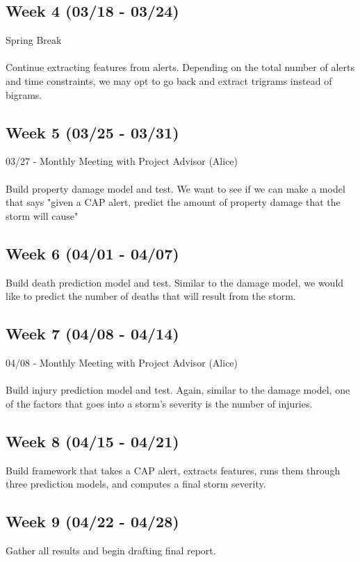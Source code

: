 \documentclass{article}
\begin{document}
\subsection*{Week 4 (03/18 - 03/24)}
Spring Break\\
\\
Continue extracting features from alerts. Depending on the total number of alerts and time constraints, we may opt to go back and extract trigrams instead of bigrams.

\subsection*{Week 5 (03/25 - 03/31)}
03/27 - Monthly Meeting with Project Advisor (Alice)\\
\\
Build property damage model and test. We want to see if we can make a model that says "given a CAP alert, predict the amount of property damage that the storm will cause"

\subsection*{Week 6 (04/01 - 04/07)}
Build death prediction model and test. Similar to the damage model, we would like to predict the number of deaths that will result from the storm.

\subsection*{Week 7 (04/08 - 04/14)}
04/08 - Monthly Meeting with Project Advisor (Alice)\\
\\
Build injury prediction model and test. Again, similar to the damage model, one of the factors that goes into a storm's severity is the number of injuries.

\subsection*{Week 8 (04/15 - 04/21)}
Build framework that takes a CAP alert, extracts features, runs them through three prediction models, and computes a final storm severity.

\subsection*{Week 9 (04/22 - 04/28)}
Gather all results and begin drafting final report.
\end{document}
